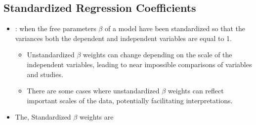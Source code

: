 \begin{itemize}
\begin{itemize}
\begin{itemize}
    \end{itemize}
  \end{itemize}

  \subsection{Standardized Regression Coefficients}
  \begin{itemize}
    \item {}: when the free parameters \(\beta\) of a model have been standardized so that the variances both the dependent and independent variables are equal to 1.
      \begin{itemize}
        \item Unstandardized \(\beta \) weights can change depending on the scale of the independent variables, leading to near impossible comparisons of variables and studies.
        \item There are some cases where unstandardized \(\beta \) weights can reflect important scales of the data, potentially facilitating interpretations. 
      \end{itemize}
    \item The, Standardized \(\beta \) weights are 
  \end{itemize}
  
\end{itemize}

